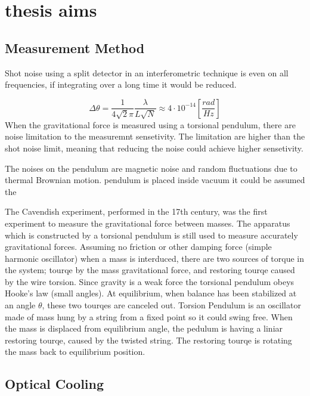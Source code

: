 \documentclass[\main/master.tex]{subfiles}
\begin{document}
\chapter{thesis aims}\label{chp:example-2}
\section{Measurement Method}
Shot noise using a split detector in an interferometric technique is even on all frequencies, if integrating over a long time it would be reduced.

\begin{equation}
\Delta\theta = \frac{1}{4\sqrt{2}\pi}\frac{\lambda}{L\sqrt{N}} \approx
4\cdot10^{-14} [\frac{rad}{Hz}]    \label{eqn:gravitation_tourqe}
\end{equation}
When the gravitational force is measured using a torsional pendulum, there are noise limitation to the measuremnt sensetivity. The limitation are higher than the shot noise limit, meaning that reducing the noise could achieve higher sensetivity.
\par
The noises on the pendulum are magnetic noise and random fluctuations due to thermal Brownian motion.
pendulum is placed inside vacuum it could be assumed the 



The Cavendish experiment, performed in the 17th century, was the first experiment to measure the gravitational force between masses. The apparatus which is constructed by a torsional pendulum is still used to measure accurately gravitational forces. Assuming no friction or other damping force (simple harmonic oscillator) when a mass is interduced, there are two sources of torque in the system; tourqe by the mass gravitational force, and restoring tourqe caused by the wire torsion. Since gravity is a weak force the torsional pendulum obeys Hooke’s law (small angles). At equilibrium, when balance has been stabilized at an angle $\theta$, these two tourqes are canceled out.
Torsion Pendulum is an oscillator made of mass hung by a string from a fixed point so it could swing free. When the mass is displaced from equilibrium angle, the pedulum is having a liniar restoring tourqe, caused by the twisted string. The restoring tourqe is rotating the mass back to equilibrium position.
 
\section{Optical Cooling}
\end{document}
